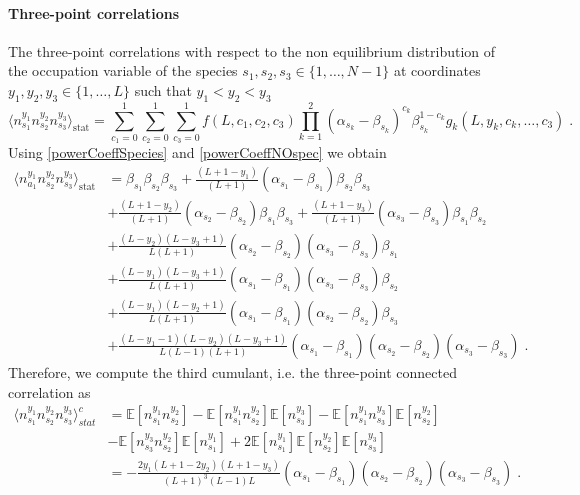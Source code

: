 \documentclass[10pt]{article}
\numberwithin{equation}{section}
\numberwithin{equation}{subsection}
\newcommand{\dt}{\;.}
\begin{document}
\paragraph{Three-point correlations}
The three-point correlations with respect to the non equilibrium distribution of the occupation variable of the species $s_{1},s_{2},s_{3}\in \{1,\ldots,N-1\}$ at coordinates $y_{1},y_{2},y_{3}\in \{1,\ldots,L\}$ such that $y_{1}<y_{2}<y_{3}$
\begin{equation}
    \langle n_{s_{1}}^{y_{1}}n_{s_{2}}^{y_{2}}n_{s_{3}}^{y_{3}}\rangle_{\text{stat}}=\sum_{c_{1}=0}^{1}\sum_{c_{2}=0}^{1}\sum_{c_{3}=0}^{1}f(L,c_{1},c_{2},c_{3})\prod_{k=1}^{2}(\alpha_{s_{k}}-\beta_{s_{k}})^{c_{k}}\beta_{s_{k}}^{1-c_{k}}g_{k}(L,y_{k},c_{k},\ldots,c_{3})\dt
\end{equation}
Using \eqref{powerCoeffSpecies} and \eqref{powerCoeffNOspec} we obtain 
\begin{align}\label{three-pts-corr}
        \langle n_{a_{1}}^{y_{1}}n_{s_{2}}^{y_{2}}n_{s_{3}}^{y_{3}}\rangle_{\text{stat}}&=\beta_{s_{1}}\beta_{s_{2}}\beta_{s_{3}}+\frac{(L+1-y_{1})}{(L+1)}(\alpha_{s_{1}}-\beta_{s_{1}})\beta_{s_{2}}\beta_{s_{3}}
        \\&+\nonumber
        \frac{(L+1-y_{2})}{(L+1)}(\alpha_{s_{2}}-\beta_{s_{2}})\beta_{s_{1}}\beta_{s_{3}}+\frac{(L+1-y_{3})}{(L+1)}(\alpha_{s_{3}}-\beta_{s_{3}})\beta_{s_{1}}\beta_{s_{2}}
        \\&+\nonumber
        \frac{(L-y_{2})(L-y_{3}+1)}{L(L+1)}(\alpha_{s_{2}}-\beta_{s_{2}})(\alpha_{s_{3}}-\beta_{s_{3}})\beta_{s_{1}}
        \\&+\nonumber
        \frac{(L-y_{1})(L-y_{3}+1)}{L(L+1)}(\alpha_{s_{1}}-\beta_{s_{1}})(\alpha_{s_{3}}-\beta_{s_{3}})\beta_{s_{2}}
        \\&+\nonumber
        \frac{(L-y_{1})(L-y_{2}+1)}{L(L+1)}(\alpha_{s_{1}}-\beta_{s_{1}})(\alpha_{s_{2}}-\beta_{s_{2}})\beta_{s_{3}}
        \\&+\nonumber
        \frac{(L-y_{1}-1)(L-y_{2})(L-y_{3}+1)}{L(L-1)(L+1)}(\alpha_{s_{1}}-\beta_{s_{1}})(\alpha_{s_{2}}-\beta_{s_{2}})(\alpha_{s_{3}}-\beta_{s_{3}})\dt
\end{align}
Therefore, we compute the third cumulant, i.e. the three-point connected correlation as 
\begin{align}
	\langle n_{s_{1}}^{y_{1}}n_{s_{2}}^{y_{2}}n_{s_{3}}^{y_{3}}\rangle_{stat}^{c}&=\mathbb{E}\left[n_{s_{1}}^{y_{1}}n_{s_{2}}^{y_{2}}\right]-\mathbb{E}\left[n_{s_{1}}^{y_{1}}n_{s_{2}}^{y_{2}}\right]\mathbb{E}\left[n_{s_{3}}^{y_{3}}\right]-\mathbb{E}\left[n_{s_{1}}^{y_{1}}n_{s_{3}}^{y_{3}}\right]\mathbb{E}\left[n_{s_{2}}^{y_{2}}\right]\nonumber\\&-\mathbb{E}\left[n_{s_{3}}^{y_{3}}n_{s_{2}}^{y_{2}}\right]\mathbb{E}\left[n_{s_{1}}^{y_{1}}\right]+2\mathbb{E}\left[n_{s_{1}}^{y_{1}}\right]\mathbb{E}\left[n_{s_{2}}^{y_{2}}\right]\mathbb{E}\left[n_{s_{3}}^{y_{3}}\right]\nonumber
	\\&=
	-\frac{2y_{1}(L+1-2y_{2})(L+1-y_{3})}{(L+1)^{3}(L-1)L}(\alpha_{s_{1}}-\beta_{s_{1}})(\alpha_{s_{2}}-\beta_{s_{2}})(\alpha_{s_{3}}-\beta_{s_{3}})\dt
\end{align}
\end{document}

